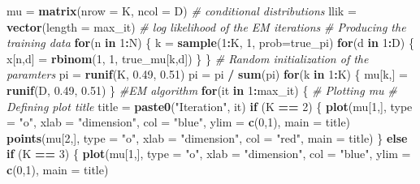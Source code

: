 \documentclass[]{article}
\newenvironment{Shaded}{\begin{snugshade}}{\end{snugshade}}
\newcommand{\KeywordTok}[1]{\textcolor[rgb]{0.13,0.29,0.53}{\textbf{#1}}}
\newcommand{\DataTypeTok}[1]{\textcolor[rgb]{0.13,0.29,0.53}{#1}}
\newcommand{\DecValTok}[1]{\textcolor[rgb]{0.00,0.00,0.81}{#1}}
\newcommand{\FloatTok}[1]{\textcolor[rgb]{0.00,0.00,0.81}{#1}}
\newcommand{\StringTok}[1]{\textcolor[rgb]{0.31,0.60,0.02}{#1}}
\newcommand{\CommentTok}[1]{\textcolor[rgb]{0.56,0.35,0.01}{\textit{#1}}}
\newcommand{\ControlFlowTok}[1]{\textcolor[rgb]{0.13,0.29,0.53}{\textbf{#1}}}
\newcommand{\OperatorTok}[1]{\textcolor[rgb]{0.81,0.36,0.00}{\textbf{#1}}}
\newcommand{\NormalTok}[1]{#1}
\begin{document}
\begin{Shaded}
\begin{Highlighting}[]
\NormalTok{mu =}\StringTok{ }\KeywordTok{matrix}\NormalTok{(}\DataTypeTok{nrow =}\NormalTok{ K, }\DataTypeTok{ncol =}\NormalTok{ D) }\CommentTok{# conditional distributions}
\NormalTok{llik =}\StringTok{ }\KeywordTok{vector}\NormalTok{(}\DataTypeTok{length =}\NormalTok{ max_it) }\CommentTok{# log likelihood of the EM iterations}
\CommentTok{# Producing the training data}
\ControlFlowTok{for}\NormalTok{(n }\ControlFlowTok{in} \DecValTok{1}\OperatorTok{:}\NormalTok{N) \{}
\NormalTok{k =}\StringTok{ }\KeywordTok{sample}\NormalTok{(}\DecValTok{1}\OperatorTok{:}\NormalTok{K, }\DecValTok{1}\NormalTok{, }\DataTypeTok{prob=}\NormalTok{true_pi)}
\ControlFlowTok{for}\NormalTok{(d }\ControlFlowTok{in} \DecValTok{1}\OperatorTok{:}\NormalTok{D) \{}
\NormalTok{x[n,d] =}\StringTok{ }\KeywordTok{rbinom}\NormalTok{(}\DecValTok{1}\NormalTok{, }\DecValTok{1}\NormalTok{, true_mu[k,d])}
\NormalTok{\}}
\NormalTok{\}}
\CommentTok{# Random initialization of the paramters}
\NormalTok{pi =}\StringTok{ }\KeywordTok{runif}\NormalTok{(K, }\FloatTok{0.49}\NormalTok{, }\FloatTok{0.51}\NormalTok{)}
\NormalTok{pi =}\StringTok{ }\NormalTok{pi }\OperatorTok{/}\StringTok{ }\KeywordTok{sum}\NormalTok{(pi)}
\ControlFlowTok{for}\NormalTok{(k }\ControlFlowTok{in} \DecValTok{1}\OperatorTok{:}\NormalTok{K) \{}
\NormalTok{mu[k,] =}\StringTok{ }\KeywordTok{runif}\NormalTok{(D, }\FloatTok{0.49}\NormalTok{, }\FloatTok{0.51}\NormalTok{)}
\NormalTok{\}}
\CommentTok{#EM algorithm}
\ControlFlowTok{for}\NormalTok{(it }\ControlFlowTok{in} \DecValTok{1}\OperatorTok{:}\NormalTok{max_it) \{}
\CommentTok{# Plotting mu}
\CommentTok{# Defining plot title}
\NormalTok{title =}\StringTok{ }\KeywordTok{paste0}\NormalTok{(}\StringTok{"Iteration"}\NormalTok{, it)}
\ControlFlowTok{if}\NormalTok{ (K }\OperatorTok{==}\StringTok{ }\DecValTok{2}\NormalTok{) \{}
\KeywordTok{plot}\NormalTok{(mu[}\DecValTok{1}\NormalTok{,], }\DataTypeTok{type =} \StringTok{"o"}\NormalTok{, }\DataTypeTok{xlab =} \StringTok{"dimension"}\NormalTok{, }\DataTypeTok{col =} \StringTok{"blue"}\NormalTok{, }\DataTypeTok{ylim =} \KeywordTok{c}\NormalTok{(}\DecValTok{0}\NormalTok{,}\DecValTok{1}\NormalTok{), }\DataTypeTok{main =}\NormalTok{ title)}
\KeywordTok{points}\NormalTok{(mu[}\DecValTok{2}\NormalTok{,], }\DataTypeTok{type =} \StringTok{"o"}\NormalTok{, }\DataTypeTok{xlab =} \StringTok{"dimension"}\NormalTok{, }\DataTypeTok{col =} \StringTok{"red"}\NormalTok{, }\DataTypeTok{main =}\NormalTok{ title)}
\NormalTok{\} }\ControlFlowTok{else} \ControlFlowTok{if}\NormalTok{ (K }\OperatorTok{==}\StringTok{ }\DecValTok{3}\NormalTok{) \{}
\KeywordTok{plot}\NormalTok{(mu[}\DecValTok{1}\NormalTok{,], }\DataTypeTok{type =} \StringTok{"o"}\NormalTok{, }\DataTypeTok{xlab =} \StringTok{"dimension"}\NormalTok{, }\DataTypeTok{col =} \StringTok{"blue"}\NormalTok{, }\DataTypeTok{ylim =} \KeywordTok{c}\NormalTok{(}\DecValTok{0}\NormalTok{,}\DecValTok{1}\NormalTok{), }\DataTypeTok{main =}\NormalTok{ title)}

\end{Highlighting}
\end{Shaded}
\end{document}
